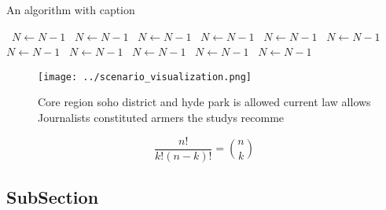 \documentclass[a4paper]{article}
\begin{document}
\begin{algorithm}
\caption{An algorithm with caption}
\begin{algorithmic}
\    \State $N \gets N - 1$
\    \State $N \gets N - 1$
\    \State $N \gets N - 1$
\    \State $N \gets N - 1$
\    \State $N \gets N - 1$
\    \State $N \gets N - 1$
\    \State $N \gets N - 1$
\    \State $N \gets N - 1$
\    \State $N \gets N - 1$
\    \State $N \gets N - 1$
\    \State $N \gets N - 1$
\EndWhile
\end{algorithmic}
\end{algorithm}

\begin{figure}
\centering
\texttt{[image: ../scenario\_visualization.png]}
\caption{Core region soho district and hyde park is allowed current law allows Journalists constituted armers the studys recomme
}
\end{figure}
 
\[ \frac{n!}{k!(n-k)!} = \binom{n}{k} \]

\subsection{SubSection}
\end{document}
